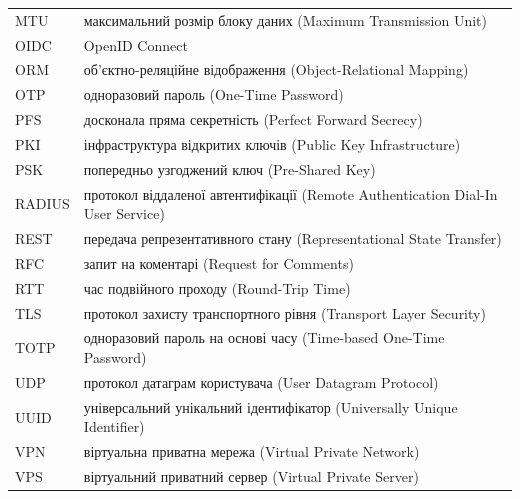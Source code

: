 \begin{longtable}{@{}l@{\hspace{1em}}p{\dimexpr\textwidth-5cm\relax}@{}}
  MTU      & максимальний розмір блоку даних (Maximum Transmission Unit) \\
  OIDC     & OpenID Connect \\
  ORM      & об'єктно-реляційне відображення (Object-Relational Mapping) \\
  OTP      & одноразовий пароль (One-Time Password) \\
  PFS      & досконала пряма секретність (Perfect Forward Secrecy) \\
  PKI      & інфраструктура відкритих ключів (Public Key Infrastructure) \\
  PSK      & попередньо узгоджений ключ (Pre-Shared Key) \\
  RADIUS   & протокол віддаленої автентифікації (Remote Authentication Dial-In User Service) \\
  REST     & передача репрезентативного стану (Representational State Transfer) \\
  RFC      & запит на коментарі (Request for Comments) \\
  RTT      & час подвійного проходу (Round-Trip Time) \\
  TLS      & протокол захисту транспортного рівня (Transport Layer Security) \\
  TOTP     & одноразовий пароль на основі часу (Time-based One-Time Password) \\
  UDP      & протокол датаграм користувача (User Datagram Protocol) \\
  UUID     & універсальний унікальний ідентифікатор (Universally Unique Identifier) \\
  VPN      & віртуальна приватна мережа (Virtual Private Network) \\
  VPS      & віртуальний приватний сервер (Virtual Private Server) \\
\end{longtable}

\newpage
